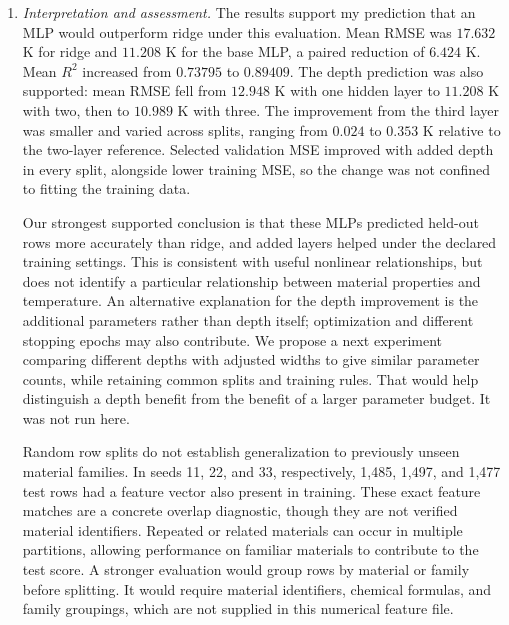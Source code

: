 \documentclass[12pt]{article}
\begin{document}
\begin{enumerate}
\begin{enumerate}[label=\textbf{\Alph*.}, leftmargin=*]
       \item \emph{Interpretation and assessment.}
       The results support my prediction that an MLP would outperform
       ridge under this evaluation. Mean RMSE was $17.632$ K for ridge
       and $11.208$ K for the base MLP, a paired reduction of $6.424$ K.
       Mean $R^2$ increased from $0.73795$ to $0.89409$.
       The depth prediction was also supported: mean RMSE fell from
       $12.948$ K with one hidden layer to $11.208$ K with two, then
       to $10.989$ K with three. The improvement from the third layer
       was smaller and varied across splits, ranging from $0.024$ to
       $0.353$ K relative to the two-layer reference.
       Selected validation MSE improved with added depth in every split,
       alongside lower training MSE, so the change was not confined to
       fitting the training data.

       Our strongest supported conclusion is that these MLPs predicted
       held-out rows more accurately than ridge, and added layers helped
       under the declared training settings. This is consistent with
       useful nonlinear relationships, but does not identify a particular
       relationship between material properties and temperature.
       An alternative explanation for the depth improvement is the
       additional parameters rather than depth itself; optimization and
       different stopping epochs may also contribute. We propose a next
       experiment comparing different depths with adjusted widths to
       give similar parameter counts, while retaining common splits and
       training rules. That would help distinguish a depth benefit from
       the benefit of a larger parameter budget. It was not run here.

       Random row splits do not establish generalization to previously
       unseen material families. In seeds 11, 22, and 33, respectively,
       1,485, 1,497, and 1,477 test rows had a feature vector also present
       in training. These exact feature matches are a concrete overlap
       diagnostic, though they are not verified material identifiers.
       Repeated or related materials can occur in multiple partitions,
       allowing performance on familiar materials to contribute to the
       test score. A stronger evaluation would group rows by material
       or family before splitting. It would require material identifiers,
       chemical formulas, and family groupings, which are not supplied
       in this numerical feature file.


\end{enumerate}
\end{enumerate}
\end{document}
